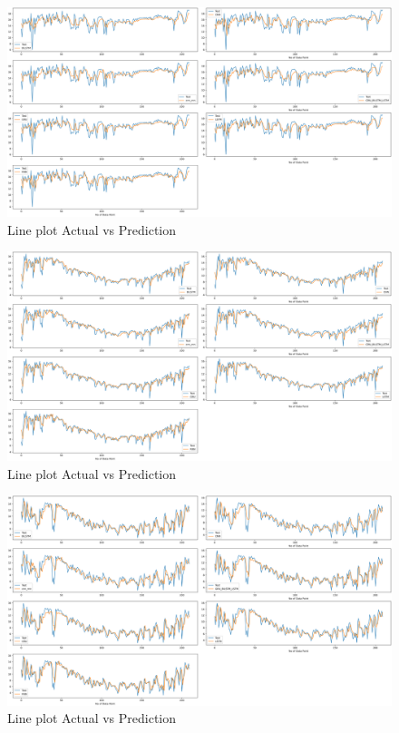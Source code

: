 \documentclass[a4paper,fleqn]{cas-sc}
\begin{document}
\begin{figure}[!ht]
\centering
\includegraphics[width=\textwidth]{new delhi_act vs pred}
\caption{Line plot Actual vs Prediction}
\label{fig:line plot}
\end{figure}


\begin{figure}[!ht]
\centering
\includegraphics[width=\textwidth]{Pokhran_act vs pred (1)}
\caption{Line plot Actual vs Prediction}
\label{fig:plot}
\end{figure}

\begin{figure}[!ht]
\centering
\includegraphics[width=\textwidth]{South Delhi_act vs pred (1)}
\caption{Line plot Actual vs Prediction}
\label{fig:Line plot}
\end{figure}
\end{document}
